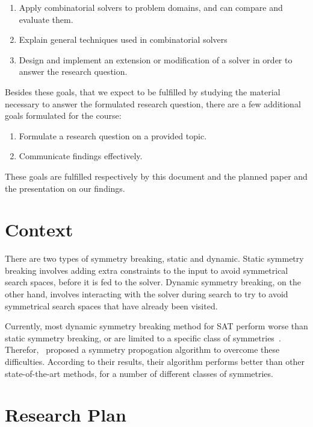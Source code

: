 			\begin{enumerate}
				\item
					Apply combinatorial solvers to problem domains, and can compare and evaluate them.
				\item
					Explain general techniques used in combinatorial solvers
				\item
					Design and implement an extension or modification of a solver in order to answer the research question.
			\end{enumerate}

			Besides these goals, that we expect to be fulfilled by studying the material necessary to answer the formulated research question, there are a few additional goals formulated for the course:

			\begin{enumerate}
				\item Formulate a research question on a provided topic.
				\item Communicate findings effectively.
			\end{enumerate}

			These goals are fulfilled respectively by this document and the planned paper and the	presentation on our findings.

	\section{Context}
	There are two types of symmetry breaking, static and dynamic. Static symmetry breaking involves adding extra constraints to the input to avoid symmetrical search spaces, before it is fed to the solver. Dynamic symmetry breaking, on the other hand, involves interacting with the solver during search to try to avoid symmetrical search spaces that have already been visited.

Currently, most dynamic symmetry breaking method for SAT perform worse than static symmetry breaking, or are limited to a specific class of symmetries~\cite{devriendt2012symmetry}. Therefor,~\cite{devriendt2012symmetry} proposed a symmetry propogation algorithm to overcome these difficulties. According to their results, their algorithm performs better than other state-of-the-art methods, for a number of different classes of symmetries.

	\section{Research Plan}

